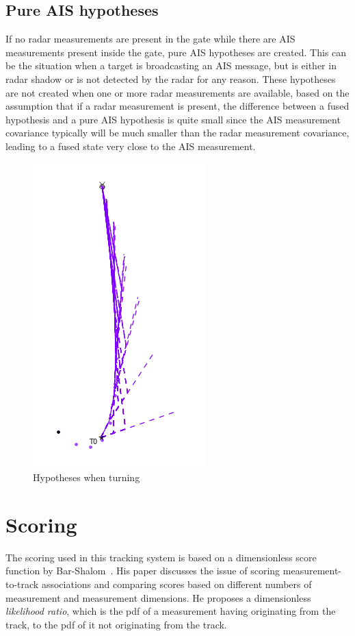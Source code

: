 \subsection{Pure AIS hypotheses}\label{subsec:pure_ais_hypotheses}
If no radar measurements are present in the gate while there are AIS measurements present inside the gate, pure AIS hypotheses are created. This can be the situation when a target is broadcasting an AIS message, but is either in radar shadow or is not detected by the radar for any reason. These hypotheses are not created when one or more radar measurements are available, based on the assumption that if a radar measurement is present, the difference between a fused hypothesis and a pure AIS hypothesis is quite small since the AIS measurement covariance typically will be much smaller than the radar measurement covariance, leading to a fused state very close to the AIS measurement.

\begin{figure}[H]
\centering
\includegraphics[height = .3\textheight]{Figures/Hypotheses_when_turning.PNG}
\caption{Hypotheses when turning}\label{fig:hypotheses_when_turning}
\end{figure}

\section{Scoring}
The scoring used in this tracking system is based on a dimensionless score function by Bar-Shalom~\cite{Bar-Shalom2007}. His paper discusses the issue of scoring measurement-to-track associations and comparing scores based on different numbers of measurement and measurement dimensions. He proposes a dimensionless \emph{likelihood ratio}, which is the \gls{pdf} of a measurement having originating from the track, to the \gls{pdf} of it not originating from the track.~


